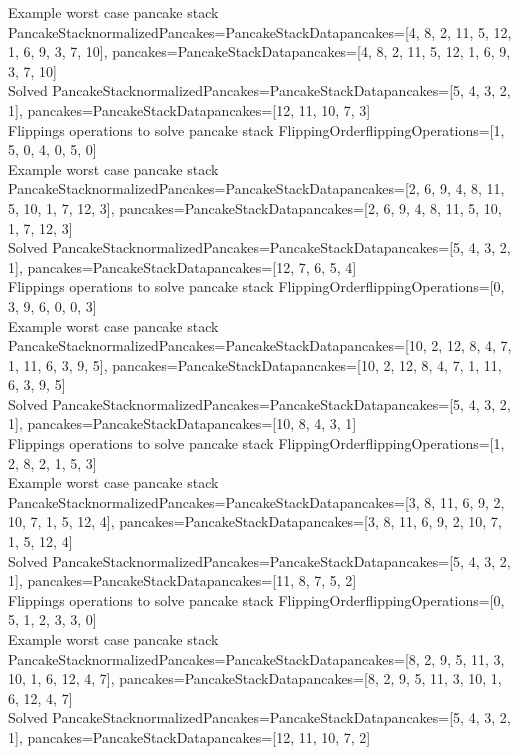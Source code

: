 Example worst case pancake stack PancakeStack{normalizedPancakes=PancakeStackData{pancakes=[4, 8, 2, 11, 5, 12, 1, 6, 9, 3, 7, 10]}, pancakes=PancakeStackData{pancakes=[4, 8, 2, 11, 5, 12, 1, 6, 9, 3, 7, 10]}} \\
Solved PancakeStack{normalizedPancakes=PancakeStackData{pancakes=[5, 4, 3, 2, 1]}, pancakes=PancakeStackData{pancakes=[12, 11, 10, 7, 3]}} \\
Flippings operations to solve pancake stack FlippingOrder{flippingOperations=[1, 5, 0, 4, 0, 5, 0]} \\
Example worst case pancake stack PancakeStack{normalizedPancakes=PancakeStackData{pancakes=[2, 6, 9, 4, 8, 11, 5, 10, 1, 7, 12, 3]}, pancakes=PancakeStackData{pancakes=[2, 6, 9, 4, 8, 11, 5, 10, 1, 7, 12, 3]}} \\
Solved PancakeStack{normalizedPancakes=PancakeStackData{pancakes=[5, 4, 3, 2, 1]}, pancakes=PancakeStackData{pancakes=[12, 7, 6, 5, 4]}} \\
Flippings operations to solve pancake stack FlippingOrder{flippingOperations=[0, 3, 9, 6, 0, 0, 3]} \\
Example worst case pancake stack PancakeStack{normalizedPancakes=PancakeStackData{pancakes=[10, 2, 12, 8, 4, 7, 1, 11, 6, 3, 9, 5]}, pancakes=PancakeStackData{pancakes=[10, 2, 12, 8, 4, 7, 1, 11, 6, 3, 9, 5]}} \\
Solved PancakeStack{normalizedPancakes=PancakeStackData{pancakes=[5, 4, 3, 2, 1]}, pancakes=PancakeStackData{pancakes=[10, 8, 4, 3, 1]}} \\
Flippings operations to solve pancake stack FlippingOrder{flippingOperations=[1, 2, 8, 2, 1, 5, 3]} \\
Example worst case pancake stack PancakeStack{normalizedPancakes=PancakeStackData{pancakes=[3, 8, 11, 6, 9, 2, 10, 7, 1, 5, 12, 4]}, pancakes=PancakeStackData{pancakes=[3, 8, 11, 6, 9, 2, 10, 7, 1, 5, 12, 4]}} \\
Solved PancakeStack{normalizedPancakes=PancakeStackData{pancakes=[5, 4, 3, 2, 1]}, pancakes=PancakeStackData{pancakes=[11, 8, 7, 5, 2]}} \\
Flippings operations to solve pancake stack FlippingOrder{flippingOperations=[0, 5, 1, 2, 3, 3, 0]} \\
Example worst case pancake stack PancakeStack{normalizedPancakes=PancakeStackData{pancakes=[8, 2, 9, 5, 11, 3, 10, 1, 6, 12, 4, 7]}, pancakes=PancakeStackData{pancakes=[8, 2, 9, 5, 11, 3, 10, 1, 6, 12, 4, 7]}} \\
Solved PancakeStack{normalizedPancakes=PancakeStackData{pancakes=[5, 4, 3, 2, 1]}, pancakes=PancakeStackData{pancakes=[12, 11, 10, 7, 2]}} \\
